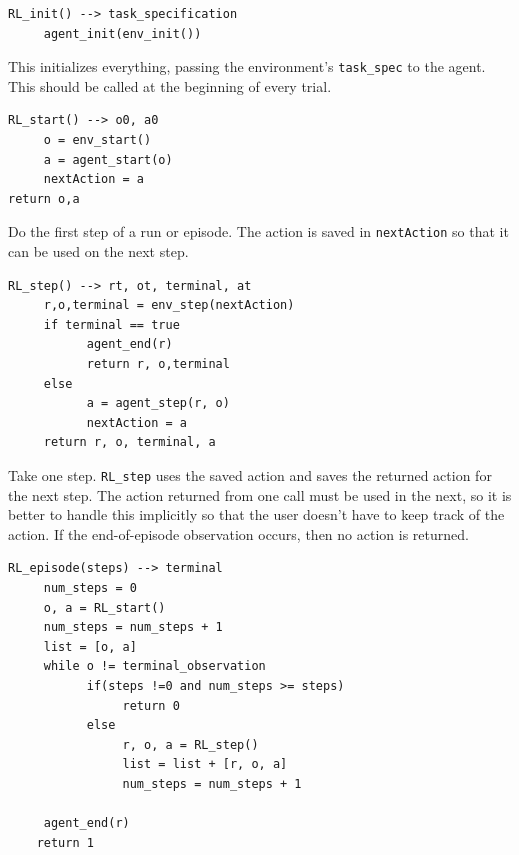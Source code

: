 \documentclass[11pt]{article}
\begin{document}
\begin{verbatim}
RL_init() --> task_specification
     agent_init(env_init())
\end{verbatim}
This initializes everything, passing the environment's \texttt{task\_spec} to the agent. This should be called at the beginning of every trial.
\begin{verbatim}
RL_start() --> o0, a0
     o = env_start()
     a = agent_start(o)
     nextAction = a
return o,a
\end{verbatim}

Do the first step of a run or episode.  The action is saved in \texttt{nextAction} so that it can be used on the next step.
\begin{verbatim}
RL_step() --> rt, ot, terminal, at
     r,o,terminal = env_step(nextAction)
     if terminal == true
           agent_end(r)
           return r, o,terminal
     else
           a = agent_step(r, o)
           nextAction = a
     return r, o, terminal, a 
\end{verbatim}
Take one step.  \texttt{RL\_step} uses the saved action and saves the returned action for the next step.  The action returned from one call must be used in the next, so it is better to handle this implicitly so that the user doesn't have to keep track of the action.  If the end-of-episode observation occurs, then no action is returned.

\begin{verbatim}
RL_episode(steps) --> terminal
     num_steps = 0
     o, a = RL_start()
     num_steps = num_steps + 1
     list = [o, a]
     while o != terminal_observation
           if(steps !=0 and num_steps >= steps)
                return 0
           else
                r, o, a = RL_step()
                list = list + [r, o, a]
                num_steps = num_steps + 1
           
     agent_end(r)
	return 1
\end{verbatim}
% 
\end{document}

